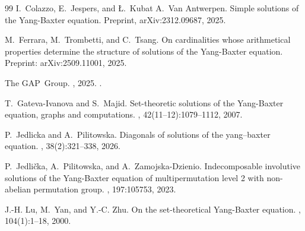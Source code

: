 \documentclass[12pt, a4paper, english]{article}
\theoremstyle{definition}
\theoremstyle{remark}
\begin{document}
\begin{thebibliography}{99}
I.~Colazzo, E.~Jespers, and {\L}.~Kubat A.~Van Antwerpen.
\newblock Simple solutions of the {Y}ang-{B}axter equation.
\newblock Preprint, arXiv:2312.09687, 2025.

M.~Ferrara, M.~Trombetti, and C.~Tsang.
\newblock On cardinalities whose arithmetical properties determine the
  structure of solutions of the {Y}ang-{B}axter equation.
\newblock Preprint: arXiv:2509.11001, 2025.

The GAP~Group.
,
  2025.
.

T.~Gateva-Ivanova and S.~Majid.
\newblock Set-theoretic solutions of the {Y}ang-{B}axter equation, graphs and
  computations.
, 42(11--12):1079--1112, 2007.

P.~Jedlicka and A.~Pilitowska.
\newblock Diagonals of solutions of the yang–baxter equation.
, 38(2):321--338, 2026.

P.~Jedli\v{c}ka, A.~Pilitowska, and A.~Zamojska-Dzienio.
\newblock Indecomposable involutive solutions of the {Y}ang-{B}axter equation
  of multipermutation level 2 with non-abelian permutation group.
, 197:105753, 2023.

J.-H. Lu, M.~Yan, and Y.-C. Zhu.
\newblock On the set-theoretical {Y}ang-{B}axter equation.
, 104(1):1--18, 2000.

\end{thebibliography}
\end{document}
